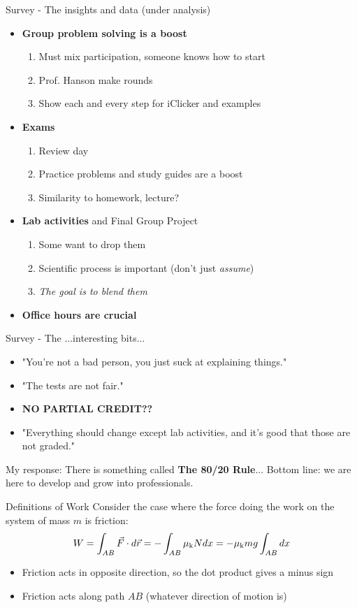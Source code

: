 \documentclass{beamer}
\begin{document}
\begin{frame}{Survey - The insights and data (under analysis)}
\small
\begin{itemize}
\item \textbf{Group problem solving is a boost}
\begin{enumerate}
\item Must mix participation, someone knows how to start
\item Prof. Hanson make rounds
\item Show each and every step for iClicker and examples
\end{enumerate}
\item \textbf{Exams}
\begin{enumerate}
\item Review day
\item Practice problems and study guides are a boost
\item \alert{Similarity to homework, lecture?}
\end{enumerate}
\item \textbf{Lab activities} and \alert{Final Group Project}
\begin{enumerate}
\item Some want to drop them
\item Scientific process is important (don't just \textit{assume})
\item \textit{The goal is to blend them}
\end{enumerate}
\item \textbf{Office hours are crucial}
\end{itemize}
\end{frame}

\begin{frame}{Survey - The ...interesting bits...}
\small
\begin{itemize}
\item "You're not a bad person, you just suck at explaining things."
\item "The tests are not fair."
\item \textbf{NO PARTIAL CREDIT??}
\item "Everything should change except lab activities, and it's good that those are not graded."
\end{itemize}
My response: There is something called \textbf{The 80/20 Rule}...  Bottom line: we are here to develop and grow into professionals.
\end{frame}

\begin{frame}{Definitions of Work}
Consider the case where the force doing the work on the system of mass $m$ is friction:
\begin{equation}
W = \int_{AB} \vec{F} \cdot d\vec{r} = -\int_{AB} \mu_{\rm k} N dx = -\mu_{\rm k} m g \int_{AB} dx 
\end{equation}
\small
\begin{itemize}
\item Friction acts in opposite direction, so the dot product gives a minus sign
\item Friction acts along path $AB$ (whatever direction of motion is)
\end{itemize}
\end{frame}
\end{document}
